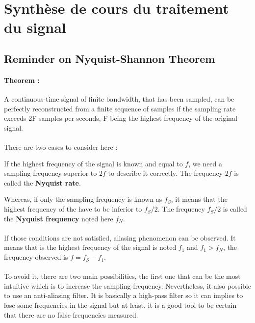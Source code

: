 \newpage
\section{Synthèse de cours du traitement du signal}

\subsection{Reminder on Nyquist-Shannon Theorem}

\paragraph{Theorem :}
A continuous-time signal of finite bandwidth, that has been
sampled, can be perfectly reconstructed from a finite sequence of
samples if the sampling rate exceeds 2F samples per seconds, F being
the highest frequency of the original signal.

\paragraph{}
There are two cases to consider here : 

If the highest frequency of the signal is known and equal to \(f\), we need a sampling frequency superior to \(2f\) to describe it correctly. The frequency \(2f\) is called the \textbf{Nyquist rate}.

Whereas, if only the sampling frequency is known as \(f_S\), it means that the highest frequency of the have to be inferior to \(f_S/2\). The frequency \(f_S / 2\) is called the \textbf{Nyquist frequency} noted here \(f_N\). 

\paragraph{}
If those conditions are not satisfied, aliasing phenomenon can be observed. It means that is the highest frequency of the signal is noted \(f_1\) and \(f_1 > f_N\), the frequency observed is \(f = f_S - f_1\).

\paragraph{}
To avoid it, there are two main possibilities, the first one that can be the most intuitive which is to increase the sampling frequency. Nevertheless, it also possible to use an anti-aliasing filter. It is basically a high-pass filter so it can implies to lose some frequencies in the signal but at least, it is a good tool to be certain that there are no false frequencies measured.


